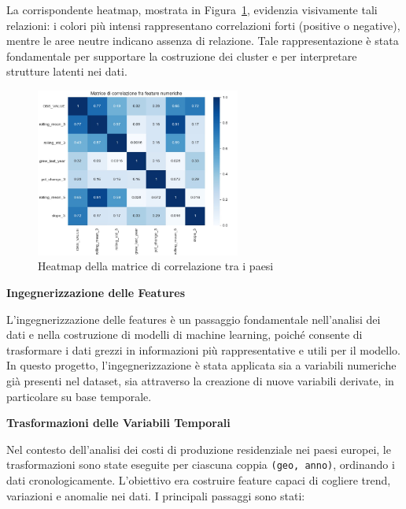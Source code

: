 \documentclass[conference]{IEEEtran}
\begin{document}
La corrispondente heatmap, mostrata in Figura~\ref{fig:correlation-heatmap}, evidenzia visivamente tali relazioni: i colori più intensi rappresentano correlazioni forti (positive o negative), mentre le aree neutre indicano assenza di relazione. Tale rappresentazione è stata fondamentale per supportare la costruzione dei cluster e per interpretare strutture latenti nei dati.

\begin{figure}[H]
\centering
\includegraphics[width=0.6\textwidth]{matrix.png} %
\caption{Heatmap della matrice di correlazione tra i paesi}
\label{fig:correlation-heatmap}
\end{figure}

\vspace{1em} \noindent\textbf{Ingegnerizzazione delle Features}

L’ingegnerizzazione delle features è un passaggio fondamentale nell’analisi dei dati e nella costruzione di modelli di machine learning, poiché consente di trasformare i dati grezzi in informazioni più rappresentative e utili per il modello. In questo progetto, l’ingegnerizzazione è stata applicata sia a variabili numeriche già presenti nel dataset, sia attraverso la creazione di nuove variabili derivate, in particolare su base temporale.

\vspace{1em} \noindent\textbf{Trasformazioni delle Variabili Temporali}

Nel contesto dell’analisi dei costi di produzione residenziale nei paesi europei, le trasformazioni sono state eseguite per ciascuna coppia \texttt{(geo, anno)}, ordinando i dati cronologicamente. L’obiettivo era costruire feature capaci di cogliere trend, variazioni e anomalie nei dati. I principali passaggi sono stati:
\end{document}
